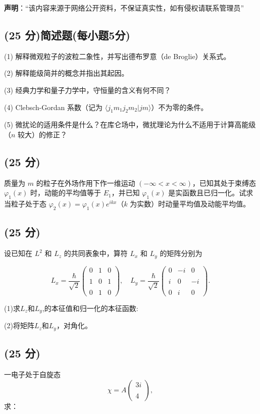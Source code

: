 
\textbf{声明}：“该内容来源于网络公开资料，不保证真实性，如有侵权请联系管理员”

\subsection{(25 分)简述题(每小题5分)}
(1) 解释微观粒子的波粒二象性，并写出德布罗意（de Broglie）关系式。

(2) 解释能级简并的概念并指出其起因。

(3) 经典力学和量子力学中，守恒量的含义有何不同？

(4) Clebsch-Gordan 系数（记为 $\langle  j_1 m_1 j_2 m_2|j m  \rangle$）不为零的条件。

(5) 微扰论的适用条件是什么？在库仑场中，微扰理论为什么不适用于计算高能级（$n$ 较大）的修正？

\subsection{(25 分)}
质量为 \( m \) 的粒子在外场作用下作一维运动 \((- \infty < x < \infty)\)，已知其处于束缚态 \(\varphi_1(x)\) 时，动能的平均值等于 \( E_1 \)，并已知 \(\varphi_1(x)\) 是实函数且已归一化。试求当粒子处于态 \(\varphi_2(x) = \varphi_1(x) e^{ikx}\)（\(k\) 为实数）时动量平均值及动能平均值。
\subsection{(25 分)}
设已知在 \( L^2 \) 和 \( L_z \) 的共同表象中，算符 \( L_x \) 和 \( L_y \) 的矩阵分别为

$$L_x = \frac{\hbar}{\sqrt{2}}\begin{pmatrix}0 & 1 & 0 \\\\1 & 0 & 1 \\\\0 & 1 & 0\end{pmatrix}, \quad L_y = \frac{\hbar}{\sqrt{2}}\begin{pmatrix}0 & -i & 0 \\\\i & 0 & -i \\\\0 & i & 0\end{pmatrix}.~$$

(1)求\( L_z \)和\( L_y \),的本征值和归一化的本征函数:

(2)将矩阵\( L_z \)和\( L_y \)，对角化。
\subsection{(25 分)}
一电子处于自旋态
\[\chi = A\begin{pmatrix}3i \\\\4\end{pmatrix},~\]
求：

